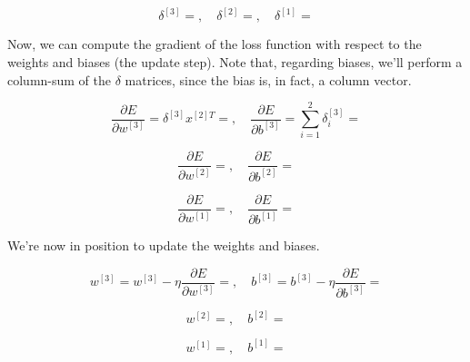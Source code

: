 \documentclass[12pt]{article}
\begin{document}
\begin{enumerate}[leftmargin=\labelsep]
  \begin{equation*}
    \delta^{[3]} = , \quad
    \delta^{[2]} = , \quad
    \delta^{[1]} = 
  \end{equation*}

  Now, we can compute the gradient of the loss function with respect to the
  weights and biases (the update step). Note that, regarding biases, we'll perform
  a column-sum of the $\delta$ matrices, since the bias is, in fact, a column vector.

  \begin{equation*}
    \frac{\partial E}{\partial w^{[3]}} = \delta^{[3]} x^{[2]T} = , \quad
    \frac{\partial E}{\partial b^{[3]}} = \sum_{i=1}^2 \delta_i^{[3]} = 
  \end{equation*}

  \begin{equation*}
    \frac{\partial E}{\partial w^{[2]}} = , \quad
    \frac{\partial E}{\partial b^{[2]}} = 
  \end{equation*}

  \begin{equation*}
    \frac{\partial E}{\partial w^{[1]}} = , \quad
    \frac{\partial E}{\partial b^{[1]}} = 
  \end{equation*}

  We're now in position to update the weights and biases.

  \begin{equation*}
    w^{[3]} = w^{[3]} - \eta \frac{\partial E}{\partial w^{[3]}} = , \quad
    b^{[3]} = b^{[3]} - \eta \frac{\partial E}{\partial b^{[3]}} = 
  \end{equation*}

  \begin{equation*}
    w^{[2]} = , \quad
    b^{[2]} = 
  \end{equation*}

  \begin{equation*}
    w^{[1]} = , \quad
    b^{[1]} = 
  \end{equation*}


\end{enumerate}
\end{document}
